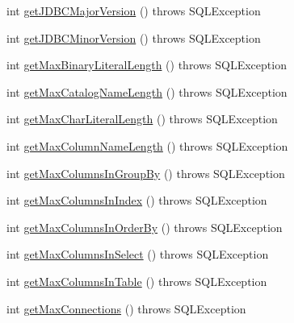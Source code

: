 \begin{DoxyCompactItemize}
\item 
int \mbox{\hyperlink{classcom_1_1mysql_1_1jdbc_1_1_database_meta_data_a7e81f0258c5a1ce3c578c811e683ee41}{get\+J\+D\+B\+C\+Major\+Version}} ()  throws S\+Q\+L\+Exception 
\item 
int \mbox{\hyperlink{classcom_1_1mysql_1_1jdbc_1_1_database_meta_data_aa915d1fb8aa1d88240c8989faea490bc}{get\+J\+D\+B\+C\+Minor\+Version}} ()  throws S\+Q\+L\+Exception 
\item 
int \mbox{\hyperlink{classcom_1_1mysql_1_1jdbc_1_1_database_meta_data_a6df3e946caaea6c1f3a92b41ee257859}{get\+Max\+Binary\+Literal\+Length}} ()  throws S\+Q\+L\+Exception 
\item 
int \mbox{\hyperlink{classcom_1_1mysql_1_1jdbc_1_1_database_meta_data_a3318249583c53777aa843eaad03ba75e}{get\+Max\+Catalog\+Name\+Length}} ()  throws S\+Q\+L\+Exception 
\item 
int \mbox{\hyperlink{classcom_1_1mysql_1_1jdbc_1_1_database_meta_data_afc0631adb18ae781b9c25bd3838dd74a}{get\+Max\+Char\+Literal\+Length}} ()  throws S\+Q\+L\+Exception 
\item 
int \mbox{\hyperlink{classcom_1_1mysql_1_1jdbc_1_1_database_meta_data_a630db9c551a23a5d0737a53f5449c01a}{get\+Max\+Column\+Name\+Length}} ()  throws S\+Q\+L\+Exception 
\item 
int \mbox{\hyperlink{classcom_1_1mysql_1_1jdbc_1_1_database_meta_data_a5eca1d6e17be8537a3c2319c7b384a43}{get\+Max\+Columns\+In\+Group\+By}} ()  throws S\+Q\+L\+Exception 
\item 
int \mbox{\hyperlink{classcom_1_1mysql_1_1jdbc_1_1_database_meta_data_acf1c7ff363547d4f88471c8bdd42505d}{get\+Max\+Columns\+In\+Index}} ()  throws S\+Q\+L\+Exception 
\item 
int \mbox{\hyperlink{classcom_1_1mysql_1_1jdbc_1_1_database_meta_data_a1ee89c339f98c6c6e8c4ddcfe77b21f4}{get\+Max\+Columns\+In\+Order\+By}} ()  throws S\+Q\+L\+Exception 
\item 
int \mbox{\hyperlink{classcom_1_1mysql_1_1jdbc_1_1_database_meta_data_a9b7ced028d89b5e05660f76eaef80c4a}{get\+Max\+Columns\+In\+Select}} ()  throws S\+Q\+L\+Exception 
\item 
int \mbox{\hyperlink{classcom_1_1mysql_1_1jdbc_1_1_database_meta_data_aaa5af70bb61c9992facf7c5c0eadca7c}{get\+Max\+Columns\+In\+Table}} ()  throws S\+Q\+L\+Exception 
\item 
int \mbox{\hyperlink{classcom_1_1mysql_1_1jdbc_1_1_database_meta_data_a4e70ed7b720c2054d2854ff492b77de8}{get\+Max\+Connections}} ()  throws S\+Q\+L\+Exception 
\item 

\end{DoxyCompactItemize}
